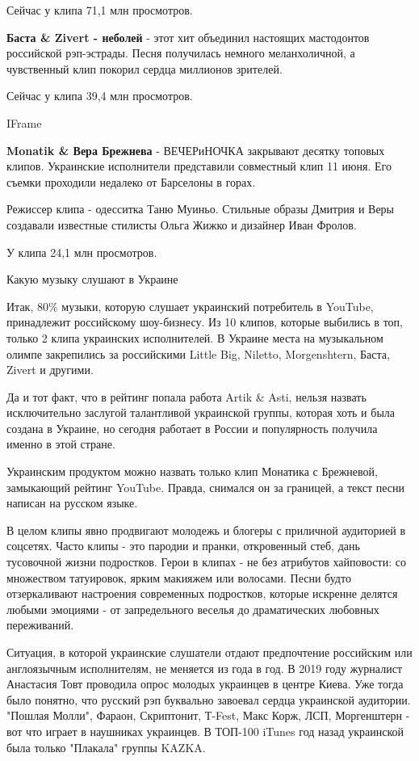 Сейчас у клипа 71,1 млн просмотров. 

\textbf{Баста \& Zivert - неболей} - этот хит объединил настоящих мастодонтов
российской рэп-эстрады. Песня получилась немного меланхоличной, а
чувственный клип покорил сердца миллионов зрителей. 

Сейчас у клипа 39,4 млн просмотров. 

IFrame

\textbf{Monatik \& Вера Брежнева} - ВЕЧЕРиНОЧКА закрывают десятку топовых клипов.
Украинские исполнители представили совместный клип 11 июня. Его съемки
проходили недалеко от Барселоны в горах. 

Режиссер клипа - одесситка Таню Муиньо. Стильные образы Дмитрия и Веры
создавали известные стилисты Ольга Жижко и дизайнер Иван Фролов.

У клипа 24,1 млн просмотров. 

Какую музыку слушают в Украине 

Итак, 80\% музыки, которую слушает украинский потребитель в YouTube,
принадлежит российскому шоу-бизнесу. Из 10 клипов, которые выбились в топ,
только 2 клипа украинских исполнителей. В Украине места на музыкальном
олимпе закрепились за российскими Little
Big, Niletto, Morgenshtern, Баста, Zivert и другими.

Да и тот факт, что в рейтинг попала работа Artik \& Asti, нельзя назвать
исключительно заслугой талантливой украинской группы, которая хоть и была
создана в Украине, но сегодня работает в России и популярность получила
именно в этой стране.

Украинским продуктом можно назвать только клип Монатика с Брежневой,
замыкающий рейтинг YouTube. Правда, снимался он за границей, а текст песни
написан на русском языке.

В целом клипы явно продвигают молодежь и блогеры с приличной аудиторией в
соцсетях. Часто клипы - это пародии и пранки, откровенный стеб, дань
тусовочной жизни подростков. Герои в клипах - не без атрибутов хайповости:
со множеством татуировок, ярким макияжем или волосами. Песни будто
отзеркаливают настроения современных подростков, которые искренне делятся
любыми эмоциями - от запредельного веселья до драматических любовных
переживаний. 

Ситуация, в которой украинские слушатели отдают предпочтение российским
или англоязычным исполнителям, не меняется из года в год. В 2019 году
журналист Анастасия Товт проводила опрос молодых украинцев в центре Киева.
Уже тогда было понятно, что русский рэп буквально завоевал сердца
украинской аудитории. "Пошлая Молли", Фараон, Скриптонит, Т-Fest, Макс
Корж, ЛСП, Моргенштерн - вот что играет в наушниках украинцев. В ТОП-100
iTunes год назад украинской была только "Плакала" группы KAZKA.

